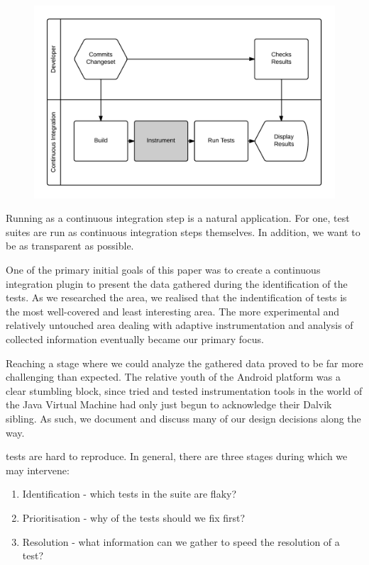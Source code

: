 \begin{figure}[h]
\includegraphics[width=\linewidth]{images/developer_workflow}
\caption{}
\label{fig:developer_workflow}
\end{figure}

Running as a continuous integration step is a natural application. For one, test suites are run as continuous integration steps themselves. In addition, we want to be as transparent as possible.

One of the primary initial goals of this paper was to create a continuous integration plugin to present the data gathered during the identification of the \flaky{} tests. As we researched the area, we realised that the indentification of \flaky{} tests is the most well-covered and least interesting area. The more experimental and relatively untouched area dealing with adaptive instrumentation and analysis of collected information eventually became our primary focus.

Reaching a stage where we could analyze the gathered data proved to be far more challenging than expected. The relative youth of the Android platform was a clear stumbling block, since tried and tested instrumentation tools in the world of the Java Virtual Machine had only just begun to acknowledge their Dalvik sibling. As such, we document and discuss many of our design decisions along the way.

\flaky{} tests are hard to reproduce. In general, there are three stages during which we may intervene:
\begin{enumerate}
	\item Identification - which tests in the suite are flaky?
	\item Prioritisation - why of the \flaky{} tests should we fix first?
	\item Resolution - what information can we gather to speed the resolution of a test?
\end{enumerate}

